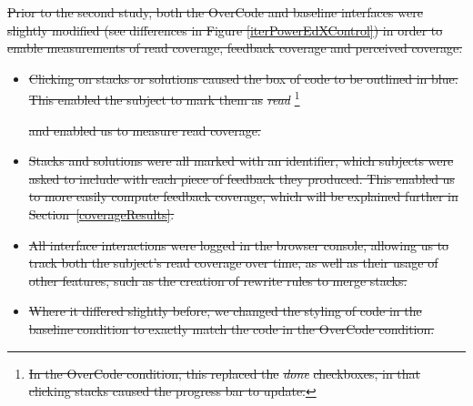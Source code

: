 \documentclass[12pt,twoside]{mitthesis}
\providecommand{\DIFdeltex}[1]{{\protect\color{red}\sout{#1}}}                      %
\providecommand{\DIFdelbegin}{} %
\providecommand{\DIFdel}[1]{\texorpdfstring{\DIFdeltex{#1}}{}} %
\begin{document}
\DIFdelbegin %
\DIFdel{Prior to the second study, both the OverCode and baseline interfaces were slightly modified (see differences in Figure \ref{iterPowerEdXControl}) in order to enable measurements of read coverage, feedback coverage and perceived coverage.
}%
 \begin{itemize} %
\item%
\DIFdel{Clicking on stacks or solutions caused the box of code to be outlined in blue. This enabled the subject to mark them as }\emph{\DIFdel{read}}%
\footnote{\DIFdel{In the OverCode condition, this replaced the }\emph{\DIFdel{done}} %
\DIFdel{checkboxes, in that clicking stacks caused the progress bar to update.}} %
\addtocounter{footnote}{-1}%
\DIFdel{and enabled us to measure read coverage.
}%
\item%
\DIFdel{Stacks and solutions were all marked with an identifier, which subjects were asked to include with each piece of feedback they produced. This enabled us to more easily compute feedback coverage, which will be explained further in Section~\ref{coverageResults}.
}%
\item%
\DIFdel{All interface interactions were logged in the browser console, allowing us to track both the subject's read coverage over time, as well as their usage of other features, such as the creation of rewrite rules to merge stacks.
}%
\item%
\DIFdel{Where it differed slightly before, we changed the styling of code in the baseline condition to exactly match the code in the OverCode condition.
}
 \end{itemize} %
\end{document}
